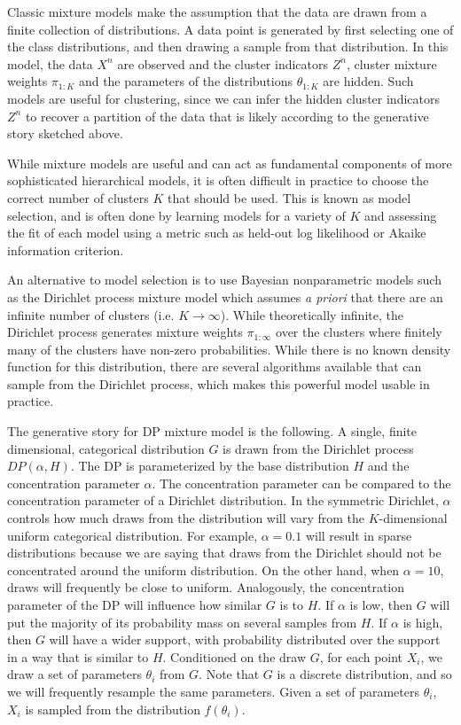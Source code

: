 Classic mixture models make the assumption that the data are drawn
from a finite collection of distributions. A data point is generated
by first selecting one of the class distributions, and then drawing a
sample from that distribution. In this model, the data $X^n$ are
observed and the cluster indicators $Z^n$, cluster mixture weights
$\pi_{1:K}$ and the parameters of the distributions $\theta_{1:K}$ are
hidden. Such models are useful for clustering, since we can infer the
hidden cluster indicators $Z^n$ to recover a partition of the data
that is likely according to the generative story sketched above.

While mixture models are useful and can act as fundamental components
of more sophisticated hierarchical models, it is often difficult in
practice to choose the correct number of clusters $K$ that should be
used. This is known as model selection, and is often done by learning
models for a variety of $K$ and assessing the fit of each model using
a metric such as held-out log likelihood or Akaike information
criterion.

An alternative to model selection is to use Bayesian nonparametric
models such as the Dirichlet process mixture model \cite{antoniak1974}
which assumes \textit{a priori} that there are an infinite number of
clusters (i.e. $K \to \infty$). While theoretically infinite, the
Dirichlet process generates mixture weights $\pi_{1:\infty}$ over the
clusters where finitely many of the clusters have non-zero
probabilities. While there is no known density function for this
distribution, there are several algorithms available that can sample
from the Dirichlet process, which makes this powerful model usable in
practice.

The generative story for DP mixture model is the following. A single,
finite dimensional, categorical distribution $G$ is drawn from the
Dirichlet process $DP(\alpha, H)$. The DP is parameterized by the base
distribution $H$ and the concentration parameter $\alpha$. The
concentration parameter can be compared to the concentration parameter
of a Dirichlet distribution. In the symmetric Dirichlet, $\alpha$
controls how much draws from the distribution will vary from the
$K$-dimensional uniform categorical distribution. For example, $\alpha
= 0.1$ will result in sparse distributions because we are saying that
draws from the Dirichlet should not be concentrated around the uniform
distribution. On the other hand, when $\alpha = 10$, draws will
frequently be close to uniform. Analogously, the concentration
parameter of the DP will influence how similar $G$ is to $H$. If
$\alpha$ is low, then $G$ will put the majority of its probability
mass on several samples from $H$. If $\alpha$ is high, then $G$ will
have a wider support, with probability distributed over the support in
a way that is similar to $H$. Conditioned on the draw $G$, for each
point $X_i$, we draw a set of parameters $\theta_i$ from $G$. Note
that $G$ is a discrete distribution, and so we will frequently
resample the same parameters. Given a set of parameters $\theta_i$,
$X_i$ is sampled from the distribution $f(\theta_i)$. 

